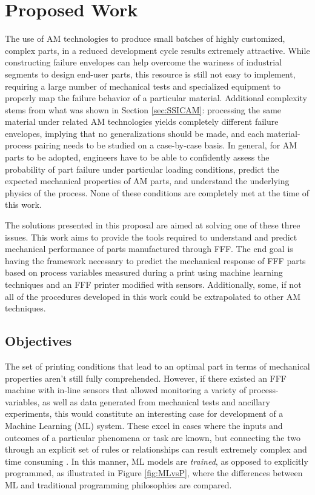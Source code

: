 \documentclass[main.tex]{subfiles}
\begin{document}
\chapter{Proposed Work} \label{ch:proposal}

The use of AM technologies to produce small batches of highly customized, complex parts, in a reduced development cycle results extremely attractive. While constructing failure envelopes can help overcome the wariness of industrial segments to design end-user parts, this resource is still not easy to implement, requiring a large number of mechanical tests and specialized equipment to properly map the failure behavior of a particular material. Additional complexity stems from what was shown in Section \ref{sec:SSICAM}: processing the same material under related AM technologies yields completely different failure envelopes, implying that no generalizations should be made, and each material-process pairing needs to be studied on a case-by-case basis. In general, for AM parts to be adopted, engineers have to be able to confidently assess the probability of part failure under particular loading conditions, predict the expected mechanical properties of AM parts, and understand the underlying physics of the process. None of these conditions are completely met at the time of this work.

The solutions presented in this proposal are aimed at solving one of these three issues. This work aims to provide the tools required to understand and predict mechanical performance of parts manufactured through FFF. The end goal is having the framework necessary to predict the mechanical response of FFF parts based on process variables measured during a print using machine learning techniques and an FFF printer modified with sensors. Additionally, some, if not all of the procedures developed in this work could be extrapolated to other AM techniques.

\section{Objectives} \label{sec:objectives}

The set of printing conditions that lead to an optimal part in terms of mechanical properties aren't still fully comprehended. However, if there existed an FFF machine with in-line sensors that allowed monitoring a variety of process-variables, as well as data generated from mechanical tests and ancillary experiments, this would constitute an interesting case for development of a Machine Learning (ML) system. These excel in cases where the inputs and outcomes of a particular phenomena or task are known, but connecting the two through an explicit set of rules or relationships can result extremely complex and time consuming \cite{Chollet2018}. In this manner, ML models are \emph{trained}, as opposed to explicitly programmed, as illustrated in Figure \ref{fig:MLvsP}, where the differences between ML and traditional programming philosophies are compared. 
\end{document}
